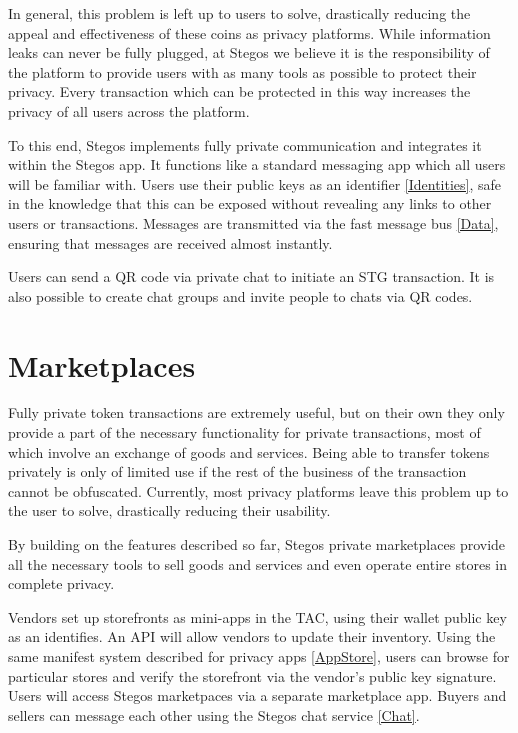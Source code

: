 \documentclass[8pt,fleqn,openany]{book}
\begin{document}
In general, this problem is left up to users to solve, drastically reducing the appeal and effectiveness of these coins as privacy platforms. While information leaks can never be fully plugged, at Stegos we believe it is the responsibility of the platform to provide users with as many tools as possible to protect their privacy. Every transaction which can be protected in this way increases the privacy of all users across the platform.

To this end, Stegos implements fully private communication and integrates it within the Stegos app. It functions like a standard messaging app which all users will be familiar with. Users use their public keys as an identifier \ref{Identities}, safe in the knowledge that this can be exposed without revealing any links to other users or transactions. Messages are transmitted via the fast message bus \ref{Data}, ensuring that messages are received almost instantly.

Users can send a QR code via private chat to initiate an STG transaction. It is also possible to create chat groups and invite people to chats via QR codes. 

\section{Marketplaces}\label{sec:marketplaces}
Fully private token transactions are extremely useful, but on their own they only provide a part of the necessary functionality for private transactions, most of which involve an exchange of goods and services. Being able to transfer tokens privately is only of limited use if the rest of the business of the transaction cannot be obfuscated. Currently, most privacy platforms leave this problem up to the user to solve, drastically reducing their usability.

By building on the features described so far, Stegos private marketplaces provide all the necessary tools to sell goods and services and even operate entire stores in complete privacy.

Vendors set up storefronts as mini-apps in the TAC, using their wallet public key as an identifies. An API will allow vendors to update their inventory. Using the same manifest system described for privacy apps \ref{AppStore}, users can browse for particular stores and verify the storefront via the vendor’s public key signature. Users will access Stegos marketpaces via a separate marketplace app. Buyers and sellers can message each other using the Stegos chat service \ref{Chat}. 
\end{document}
